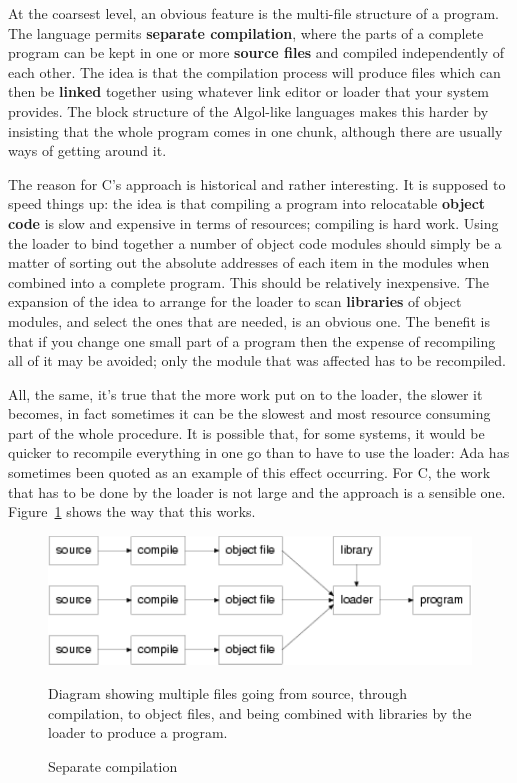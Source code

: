   At the coarsest level, an obvious feature is the multi-file structure of a
   program. The language permits \textbf{separate compilation}, where the
   parts of a complete program can be kept in one or more \textbf{source
   files} and compiled independently of each other. The idea is that the
   compilation process will produce files which can then be \textbf{linked}
   together using whatever link editor or loader that your system provides. The
   block structure of the Algol-like languages makes this harder by insisting
   that the whole program comes in one chunk, although there are usually ways
   of getting around it.


  The reason for C's approach is historical and rather interesting. It is
   supposed to speed things up: the idea is that compiling a program into
   relocatable \textbf{object code} is slow and expensive in terms of
   resources; compiling is hard work. Using the loader to bind together a
   number of object code modules should simply be a matter of sorting out the
   absolute addresses of each item in the modules when combined into a complete
   program. This should be relatively inexpensive. The expansion of the idea to
   arrange for the loader to scan \textbf{libraries} of object modules, and
   select the ones that are needed, is an obvious one. The benefit is that if
   you change one small part of a program then the expense of recompiling all
   of it may be avoided; only the module that was affected has to be
   recompiled.


  All, the same, it's true that the more work put on to the loader, the
   slower it becomes, in fact sometimes it can be the slowest and most resource
   consuming part of the whole procedure. It is possible that, for some
   systems, it would be quicker to recompile everything in one go than to have
   to use the loader: Ada has sometimes been quoted as an example of this
   effect occurring. For C, the work that has to be done by the loader is not
   large and the approach is a sensible one.
   Figure~\ref{fig:sepComp} shows the way that this works.


   \begin{figure}[htb]
     \centering
     \includegraphics[type=pdf,read=.pdf,ext=.pdf,scale=0.9]
     {figure/1.1_sepComp}
     \caption*{Diagram showing multiple files going from source,
       through compilation, to object files,
       and being combined with libraries by the loader 
       to produce a program.}
     \caption{\label{fig:sepComp}Separate compilation}
   \end{figure}


